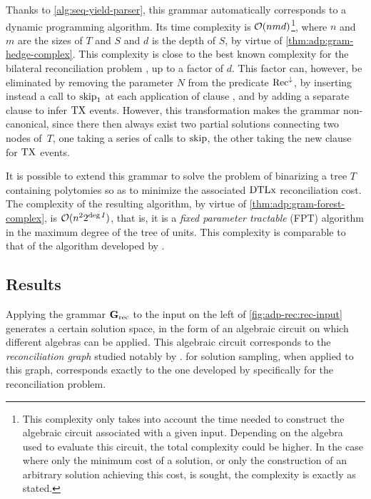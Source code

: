Thanks to \cref{alg:seq-yield-parser}, this grammar automatically corresponds to a dynamic programming algorithm.
Its time complexity is \(\operatorname{\mathcal{O}}(nmd)\)\footnote{This complexity only takes into account the time needed to construct the algebraic circuit associated with a given input. Depending on the algebra used to evaluate this circuit, the total complexity could be higher. In the case where only the minimum cost of a solution, or only the construction of an arbitrary solution achieving this cost, is sought, the complexity is exactly as stated.}, where \(n\) and \(m\) are the sizes of \(T\) and \(S\) and \(d\) is the depth of \(S\), by virtue of \cref{thm:adp:gram-hedge-complex}.
This complexity is close to the best known complexity for the bilateral reconciliation problem \parencite{Weiner2021ImprovedDuplicationTransfer}, up to a factor of \(d\).
This factor can, however, be eliminated by removing the parameter \(N\) from the predicate \(\mathrm{Rec}^{\downarrow}\), by inserting instead a call to \(\mathrm{skip}_1\) at each application of clause , and by adding a separate clause to infer \(\mathrm{TX}\) events.
However, this transformation makes the grammar non-canonical, since there then always exist two partial solutions connecting two nodes of~\(T\), one taking a series of calls to \(\mathrm{skip}\), the other taking the new clause for \(\mathrm{TX}\) events.

It is possible to extend this grammar to solve the problem of binarizing a tree \(T\) containing polytomies so as to minimize the associated \(\mathrm{D}\mathrm{T}\mathrm{L}\mathrm{x}\) reconciliation cost.
The complexity of the resulting algorithm, by virtue of \cref{thm:adp:gram-forest-complex}, is \(\operatorname{\mathcal{O}}(n^22^{\deg I})\), that is, it is a \emph{fixed parameter tractable} (FPT) algorithm in the maximum degree of the tree of units.
This complexity is comparable to that of the algorithm developed by \textcite{Kordi2016ExactAlgorithmsDuplicationTransferLoss}.

\subsection{Results}

Applying the grammar \(\mathbf{G}_{\mathrm{rec}}\) to the input on the left of \cref{fig:adp-rec:rec-input} generates a certain solution space, in the form of an algebraic circuit on which different algebras can be applied.
This algebraic circuit corresponds to the \emph{reconciliation graph} studied notably by \textcite{Scornavacca2013RepresentingSetReconciliations,Wang2022EfficientlySparseListing}.
 for solution sampling, when applied to this graph, corresponds exactly to the one developed by \textcite{Bansal2013ReconciliationRevisitedHandling} specifically for the reconciliation problem.

